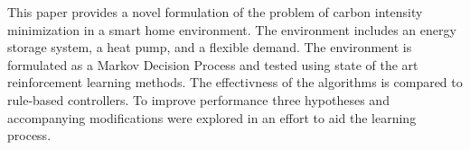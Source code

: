 This paper provides a novel formulation of the problem of carbon intensity minimization in a smart home environment. The environment includes an energy storage system, a heat pump, and a flexible demand. The environment is formulated as a Markov Decision Process and tested using state of the art reinforcement learning methods. The effectivness of the algorithms is compared to rule-based controllers. To improve performance three hypotheses and accompanying modifications were explored in an effort to aid the learning process.